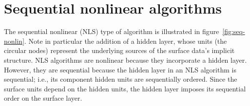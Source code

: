 

\section{Sequential nonlinear algorithms}
\label{subsec:seq-nonlin}
The sequential nonlinear (NLS) type of algorithm is illustrated in figure~\ref{fig:seq-nonlin}. 
Note in particular the addition of a hidden layer, whose units (the circular nodes)
represent the underlying sources of the surface data's implicit structure.
NLS algorithms are nonlinear because they incorporate a hidden layer.
However, they are sequential because the hidden layer in an NLS algorithm is sequential; i.e., its component hidden units
are sequentially ordered.
Since the surface units depend on the hidden units, the hidden layer imposes its sequential order on the surface layer. 

